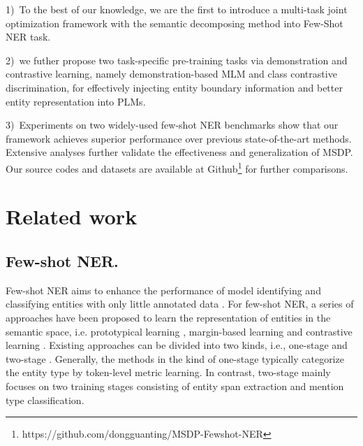 \documentclass[sigconf,natbib=true,anonymous=False]{acmart}
\begin{document}
1)~To the best of our knowledge, we are the first to introduce a multi-task joint optimization framework with the semantic decomposing method into Few-Shot NER task.


2)~we futher propose two task-specific pre-training tasks via demonstration and contrastive learning, namely demonstration-based MLM and class contrastive discrimination, for effectively injecting entity boundary information and better entity representation into PLMs. 





3)~Experiments on two widely-used few-shot NER benchmarks show that our framework achieves superior performance over previous state-of-the-art methods. Extensive analyses further validate the effectiveness and generalization of MSDP. Our source codes and datasets are available at Github\footnote{https://github.com/dongguanting/MSDP-Fewshot-NER} for further comparisons.

\section{Related work}

\subsection{Few-shot NER.}
Few-shot NER aims to enhance the performance of model identifying and classifying entities with only little annotated data \cite{ghaddar2018transforming,cao2019low,liu2020coach,jia2019cross,liu2020zero,liu2021importance,jia2020multi,zhao-etal-2022-entity,liu2021crossner,10193387,li-etal-2023-generative}. For few-shot NER, a series of approaches have been proposed to learn the representation of entities in the semantic space, i.e. prototypical learning \cite{snell2017prototypical}, margin-based learning \cite{levi2021rethinking} and contrastive learning \cite{gao2021simcse,10094766,9747192}. Existing approaches can be divided into two kinds, i.e., one-stage \cite{snell2017prototypical,hou2020few,das2021container,ziyadi2020example}  and two-stage \cite{ma2022decomposed,wu2022propose,shen2021locate,10095149}. Generally, the methods in the kind of one-stage typically categorize the entity type by token-level metric learning. In contrast, two-stage mainly focuses on two training stages consisting of entity span extraction and mention type classification.
\end{document}
